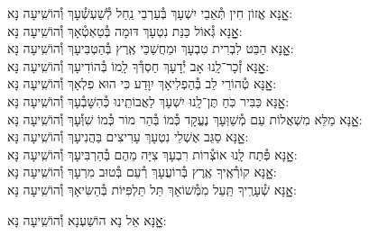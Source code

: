 \documentclass[twoside, openany, parskip=half, 11pt]{book}
\begin{document}
\begin{small}
אׇׇׇנָּא אֱזוֹן חִין תְּ֯אֵבֵי יִשְׁעָךְ בְּ֯עַרְבֵי נַֽחַל לְ֯שַׁעְשְׁ֯עָךְ \hfill וְ֯הוֹשִֽׁיעָה נָּא:\\
אׇׇׇׇׇנָּא גְּ֯אוֹל כַּנַּת נִטְעָךְ דּוּמָה בְּ֯טַאְטְ֯אָךְ \hfill וְ֯הוֹשִֽׁיעָה נָּא:\\
אׇׇׇנָּא הַבֵּט לִבְרִית טִבְעָךְ וּמַחֲשַׁכֵּי אֶֽרֶץ בְּ֯הַטְבִּיעָךְ \hfill וְ֯הוֹשִֽׁיעָה נָּא:\\
אׇׇׇׇׇנָּא זְ֯כָר־לָֽנוּ אָב יְ֯דָעָךְ חַסְדְּ֯ךָ לָֽמוֹ בְּ֯הוֹדִיעָךְ \hfill וְ֯הוֹשִֽׁיעָה נָּא:\\
אׇׇׇנָּא טְ֯הוֹרֵי לֵב בְּ֯הַפְלִיאָךְ יִוָּדַע כִּי הוּא פִלְאָךְ \hfill וְ֯הוֹשִֽׁיעָה נָּא:\\
אׇׇׇנָּא כַּבִּיר כֹּֽחַ תֶּן־לָֽנוּ יִשְׁעָךְ לַאֲבוֹתֵֽינוּ כְּ֯הִשָּׁבְ֯עָךְ \hfill וְ֯הוֹשִֽׁיעָה נָּא:\\
אׇׇׇנָּא מַלֵּא מִשְׁאֲלוֹת עַם מְ֯שַׁוְּעָךְ נֶעֱקָד כְּ֯מוֹ בְּ֯הַר מוֹר כְּ֯מוֹ שִׁוְּ֯עָךְ \hfill וְ֯הוֹשִֽׁיעָה נָּא:\\
אׇׇׇנָּא סַגֵּב אֶשְׁלֵי נִטְעָךְ עָרִיצִים בַּהֲנִיעָךְ \hfill וְ֯הוֹשִֽׁיעָה נָּא:\\
אׇׇׇנָּא פְּ֯תַח לָֽנוּ אוֹצְ֯רוֹת רִבְעָךְ צִיָּה מֵהֶם בְּ֯הַרְבִּיעָךְ \hfill וְ֯הוֹשִֽׁיעָה נָּא:\\
אׇׇׇנָּא קוֹרְ֯אֶֽיךָ אֶֽרֶץ בְּ֯רוֹעֲעָךְ רְ֯עֵם בְּ֯טוּב מִרְעָךְ \hfill וְ֯הוֹשִֽׁיעָה נָּא:\\
אׇׇׇנָּא שְׁ֯עָרֶֽיךָ תַּֽעַל מִמְּ֯שׁוֹאָךְ תֵּל תַּלְפִּיּוֹת בְּ֯הַשִּׂיאָךְ \hfill וְ֯הוֹשִֽׁיעָה נָּא:

\end{small}

\begin{large}
\shatzvkahal
אׇׇׇנָּא אֵל נָא הוֹשַׁעְנָא וְ֯הוֹשִֽׁיעָה נָּא:

\end{large}
\end{document}
